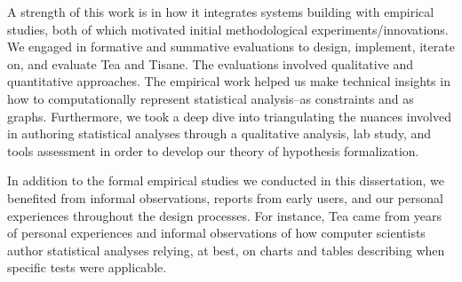 \begin{comment}
\section{Note on methodology and implications}
Overall: Integrate systems building with formative and summative evaluations and deeper dives into understanding end-users (hypothesis formalization)
- strength of this work is moving back and forth between and integrating empirical studies with systems building
- Even within empirical studies, explored and used many qualitative and quantitative approaches
- Within systems building: Use diversity of technologies
- Identify need for methodologies in the future for designing DSLs \textit{with} end-users
\subsection{Plurality of contribution types}
\end{comment}
A strength of this work is in how it integrates systems building with empirical
studies, both of which motivated initial methodological experiments/innovations.
We engaged in formative and summative evaluations to design, implement, iterate
on, and evaluate Tea and Tisane. The evaluations involved qualitative and
quantitative approaches. The empirical work helped
us make technical insights in how to computationally represent statistical
analysis--as constraints and as graphs. Furthermore, we took a deep dive into
triangulating the nuances involved in authoring statistical analyses through a
qualitative analysis, lab study, and tools assessment in order to develop our
theory of hypothesis formalization. 

In addition to the formal empirical studies we conducted in this dissertation,
we benefited from informal observations, reports from early users, and our
personal experiences throughout the design processes. For instance, Tea came
from years of personal experiences and informal observations of how computer
scientists author statistical analyses relying, at best, on charts and tables
describing when specific tests were applicable. 


